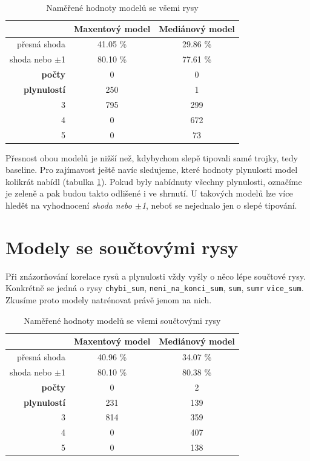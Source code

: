 \documentclass[12pt,a4paper]{report}
\begin{document}
\begin{table}[!htbp]
\begin{center}
\begin{tabular}{|r|c|c|}
\hline
 & \textbf{Maxentový model} & \textbf{Mediánový model} \\
 \hline
přesná shoda & 41.05 \%  & 29.86 \%  \\
\hline
shoda nebo $\pm$1 & 80.10 \% & 77.61 \%  \\
\hline
\textbf{počty} \quad 1 & \color{red}0 & \color{red}0 \\
\textbf{plynulostí} \quad 2 & 250 & 1 \\
 3 & 795 & 299 \\
 4 & \color{red}0 & 672 \\
 5 & \color{red}0 & 73 \\
\hline
\end{tabular}
\caption{Naměřené hodnoty modelů se všemi rysy}\label{tb:all}
\end{center}
\end{table}

Přesnost obou modelů je nižší než, kdybychom slepě tipovali samé trojky, tedy baseline. Pro zajímavost ještě navíc sledujeme, které hodnoty plynulosti model kolikrát nabídl (tabulka \ref{tb:all}). Pokud byly nabídnuty všechny plynulosti, označíme je zeleně a pak budou takto odlišené i ve shrnutí. U takových modelů lze více hledět na vyhodnocení \textit{shoda nebo $\pm$1}, neboť se nejednalo jen o slepé tipování.


\section{Modely se součtovými rysy}
Při znázorňování korelace rysů a plynulosti vždy vyšly o něco lépe součtové rysy. Konkrétně se jedná o rysy \texttt{chybi\_sum}, \texttt{neni\_na\_konci\_sum}, \texttt{sum}, \texttt{sumr} \texttt{vice\_sum}. Zkusíme proto modely natrénovat právě jenom na nich. 

\begin{table}[!htbp]
\begin{center}
\begin{tabular}{|r|c|c|}
\hline
 & \textbf{Maxentový model} & \textbf{Mediánový model} \\
 \hline
přesná shoda & 40.96 \%  & 34.07 \%  \\
\hline
shoda nebo $\pm$1 & 80.10 \% & 80.38 \%  \\
\hline
     \textbf{počty} \quad 1 & \color{red}0   & \color{OliveGreen}2   \\
\textbf{plynulostí} \quad 2 & 231 & \color{OliveGreen}139   \\
                          3 & 814 & \color{OliveGreen}359 \\
                          4 & \color{red}0   & \color{OliveGreen}407 \\
                          5 & \color{red}0   & \color{OliveGreen}138  \\
\hline
\end{tabular}
\caption{Naměřené hodnoty modelů se všemi součtovými rysy}\label{tb:allsums}
\end{center}
\end{table}
\end{document}

